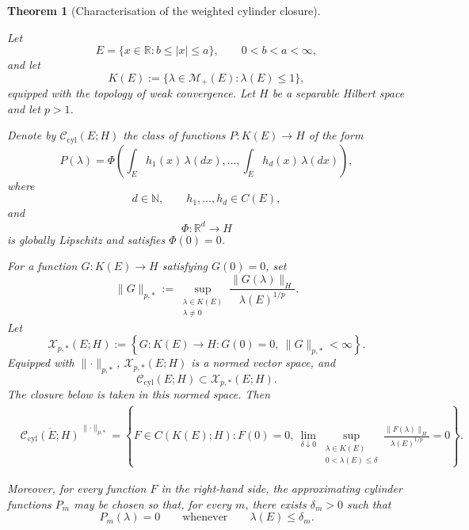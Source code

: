\documentclass[a4paper,10pt]{article}
\newtheorem{thm}{Theorem}[section]
\begin{document}
\begin{thm}[Characterisation of the weighted cylinder closure]
\label{thm:weighted-cylinder-density}

Let
\[
        E=\{x\in\mathbb R:b\le |x|\le a\},
        \qquad 0<b<a<\infty,
\]
and let
\[
        K(E)
        :=
        \bigl\{
        \lambda\in\mathcal M_+(E):
        \lambda(E)\le1
        \bigr\},
\]
equipped with the topology of weak convergence. Let \(H\) be a
separable Hilbert space and let \(p>1\).

Denote by \(\mathcal C_{\mathrm{cyl}}(E;H)\) the class of functions
\(P:K(E)\to H\) of the form
\[
P(\lambda)
=
\Phi
\left(
        \int_E h_1(x)\,\lambda(dx),
        \ldots,
        \int_E h_d(x)\,\lambda(dx)
\right),
\]
where
\[
        d\in\mathbb N,
        \qquad
        h_1,\ldots,h_d\in C(E),
\]
and
\[
        \Phi:\mathbb R^d\longrightarrow H
\]
is globally Lipschitz and satisfies \(\Phi(0)=0\).

For a function \(G:K(E)\to H\) satisfying \(G(0)=0\), set
\[
\lVert G\rVert_{p,*}
:=
\sup_{\substack{\lambda\in K(E)\\\lambda\ne0}}
\frac{\lVert G(\lambda)\rVert_H}
     {\lambda(E)^{1/p}}.
\]
Let
\[
\mathcal X_{p,*}(E;H)
:=
\left\{
G:K(E)\to H:
G(0)=0,\
\lVert G\rVert_{p,*}<\infty
\right\}.
\]
Equipped with \(\lVert\cdot\rVert_{p,*}\),
\(\mathcal X_{p,*}(E;H)\) is a normed vector space, and
\[
        \mathcal C_{\mathrm{cyl}}(E;H)
        \subset
        \mathcal X_{p,*}(E;H).
\]
The closure below is taken in this normed space. Then
\[
\begin{aligned}
&
\overline{\mathcal C_{\mathrm{cyl}}(E;H)}
^{\,\lVert\cdot\rVert_{p,*}}
=
\left\{
F\in C(K(E);H):
F(0)=0,\
\lim_{\delta\downarrow0}
\sup_{\substack{\lambda\in K(E)\\
                 0<\lambda(E)\le\delta}}
\frac{\lVert F(\lambda)\rVert_H}
     {\lambda(E)^{1/p}}
=0
\right\}.
\end{aligned}
\]

Moreover, for every function \(F\) in the right-hand side, the
approximating cylinder functions \(P_m\) may be chosen so that, for
every \(m\), there exists \(\delta_m>0\) such that
\[
        P_m(\lambda)=0
        \qquad\text{whenever}\qquad
        \lambda(E)\le\delta_m.
\]
\end{thm}
\end{document}
